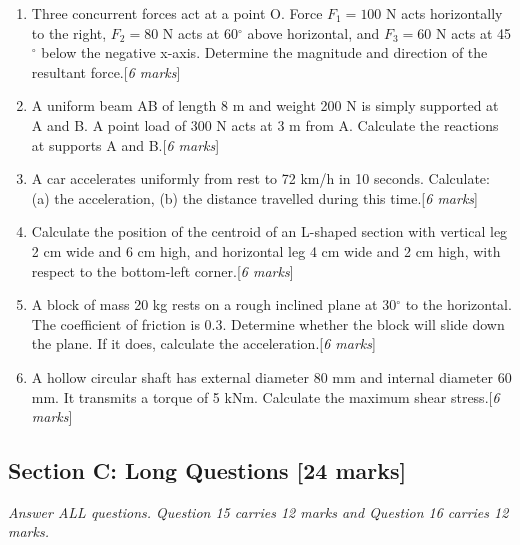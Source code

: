 \documentclass[12pt,a4paper]{article}
\newcommand{\marks}[1]{\hfill[\textit{\color{examred}#1 marks}]}
\begin{document}
\begin{enumerate}[label=\textbf{Q\arabic*.}, start=9, itemsep=15pt]

\item Three concurrent forces act at a point O. Force $F_1 = 100$ N acts horizontally to the right, $F_2 = 80$ N acts at 60$^\circ$ above horizontal, and $F_3 = 60$ N acts at 45$^\circ$ below the negative x-axis. Determine the magnitude and direction of the resultant force.\marks{6}

\item A uniform beam AB of length 8 m and weight 200 N is simply supported at A and B. A point load of 300 N acts at 3 m from A. Calculate the reactions at supports A and B.\marks{6}

\item A car accelerates uniformly from rest to 72 km/h in 10 seconds. Calculate: (a) the acceleration, (b) the distance travelled during this time.\marks{6}

\item Calculate the position of the centroid of an L-shaped section with vertical leg 2 cm wide and 6 cm high, and horizontal leg 4 cm wide and 2 cm high, with respect to the bottom-left corner.\marks{6}

\item A block of mass 20 kg rests on a rough inclined plane at 30$^\circ$ to the horizontal. The coefficient of friction is 0.3. Determine whether the block will slide down the plane. If it does, calculate the acceleration.\marks{6}

\item A hollow circular shaft has external diameter 80 mm and internal diameter 60 mm. It transmits a torque of 5 kNm. Calculate the maximum shear stress.\marks{6}

\end{enumerate}

\newpage
\subsection*{Section C: Long Questions [24 marks]}
\textit{Answer ALL questions. Question 15 carries 12 marks and Question 16 carries 12 marks.}
\end{document}
